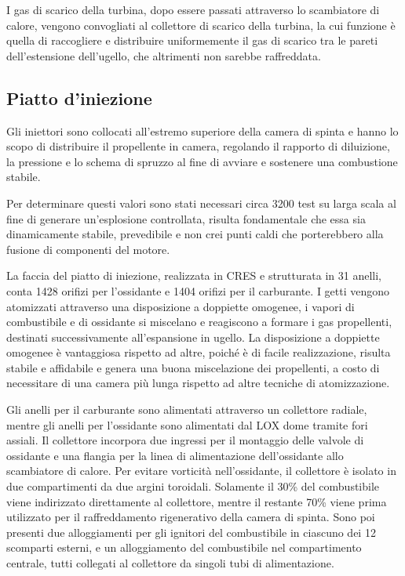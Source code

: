 I gas di scarico della turbina, dopo essere passati attraverso lo scambiatore di calore, vengono convogliati al collettore di scarico della turbina, la cui funzione è quella di raccogliere e distribuire uniformemente il gas di scarico tra le pareti dell’estensione dell'ugello, che altrimenti non sarebbe raffreddata. \cite{heroicrelics}\cite{enginehistory}


\subsection{Piatto d'iniezione}
\label{subsec:piatto iniezione}

Gli iniettori sono collocati all’estremo superiore della camera di spinta e hanno lo scopo di distribuire il propellente in camera, regolando il rapporto di diluizione, la pressione e lo schema di spruzzo al fine di avviare e sostenere una combustione stabile.


Per determinare questi valori sono stati necessari circa 3200 test su larga scala al fine di generare un’esplosione controllata, risulta fondamentale che essa sia dinamicamente stabile, prevedibile e non crei punti caldi che porterebbero alla fusione di componenti del motore.

La faccia del piatto di iniezione, realizzata in CRES e strutturata in 31 anelli, conta 1428 orifizi per l’ossidante e 1404 orifizi per il carburante. I getti vengono atomizzati attraverso una disposizione a doppiette omogenee, i vapori di combustibile e di ossidante si miscelano e reagiscono a formare i gas propellenti, destinati successivamente all’espansione in ugello. La disposizione a doppiette omogenee è vantaggiosa rispetto ad altre, poiché è di facile realizzazione, risulta stabile e affidabile e genera una buona miscelazione dei propellenti, a costo di necessitare di una camera più lunga rispetto ad altre tecniche di atomizzazione.

Gli anelli per il carburante sono alimentati attraverso un collettore radiale, mentre gli anelli per l’ossidante sono alimentati dal LOX dome tramite fori assiali.
Il collettore incorpora due ingressi per il montaggio delle valvole di ossidante e una flangia per la linea di alimentazione dell’ossidante allo scambiatore di calore. Per evitare vorticità nell’ossidante, il collettore è isolato in due compartimenti da due argini toroidali. Solamente il 30\% del combustibile viene indirizzato direttamente al collettore, mentre il restante 70\% viene prima utilizzato per il raffreddamento rigenerativo della camera di spinta.
Sono poi presenti due alloggiamenti per gli ignitori del combustibile in ciascuno dei 12 scomparti esterni, e un alloggiamento del combustibile nel compartimento centrale, tutti collegati al collettore da singoli tubi di alimentazione.

